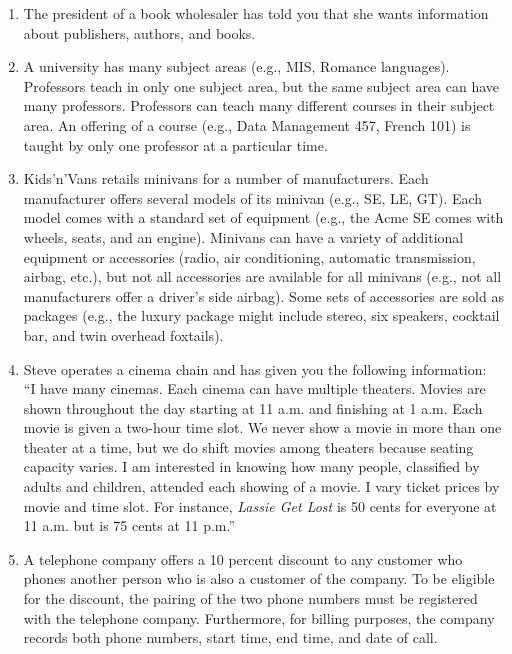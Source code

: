 \documentclass[
]{article}
\begin{document}
\begin{enumerate}
\def\labelenumi{\arabic{enumi}.}
\item
  The president of a book wholesaler has told you that she wants
  information about publishers, authors, and books.
\item
  A university has many subject areas (e.g., MIS, Romance languages).
  Professors teach in only one subject area, but the same subject area
  can have many professors. Professors can teach many different
  courses in their subject area. An offering of a course (e.g., Data
  Management 457, French 101) is taught by only one professor at a
  particular time.
\item
  Kids'n'Vans retails minivans for a number of manufacturers. Each
  manufacturer offers several models of its minivan (e.g., SE, LE,
  GT). Each model comes with a standard set of equipment (e.g., the
  Acme SE comes with wheels, seats, and an engine). Minivans can have
  a variety of additional equipment or accessories (radio, air
  conditioning, automatic transmission, airbag, etc.), but not all
  accessories are available for all minivans (e.g., not all
  manufacturers offer a driver's side airbag). Some sets of
  accessories are sold as packages (e.g., the luxury package might
  include stereo, six speakers, cocktail bar, and twin overhead
  foxtails).
\item
  Steve operates a cinema chain and has given you the following
  information:\\
  ``I have many cinemas. Each cinema can have multiple theaters. Movies
  are shown throughout the day starting at 11 a.m. and finishing at 1
  a.m. Each movie is given a two-hour time slot. We never show a movie
  in more than one theater at a time, but we do shift movies among
  theaters because seating capacity varies. I am interested in knowing
  how many people, classified by adults and children, attended each
  showing of a movie. I vary ticket prices by movie and time slot. For
  instance, \emph{Lassie Get Lost} is 50 cents for everyone at 11 a.m. but
  is 75 cents at 11 p.m.''
\item
  A telephone company offers a 10 percent discount to any customer who
  phones another person who is also a customer of the company. To be
  eligible for the discount, the pairing of the two phone numbers must
  be registered with the telephone company. Furthermore, for billing
  purposes, the company records both phone numbers, start time, end
  time, and date of call.
\end{enumerate}
\end{document}
